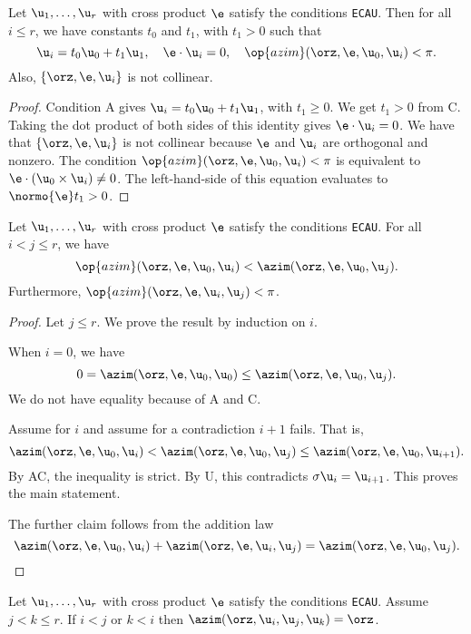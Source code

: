 \begin{lemma}[]  
Let $\u_1,\ldots,\u_r$ with cross product $\e$  satisfy the conditions {\tt ECAU}.  
Then for all $i\le r$, we have constants $t_0$ and $t_1$, with $t_1>0$ such that 
\[
\u_i = t_0 \u_0 + t_1 \u_1,\quad \e\cdot\u_i = 0,\quad \op{azim}(\orz,\e,\u_0,\u_i)<\pi.
\]
Also, $\{\orz,\e,\u_i\}$ is not collinear.
\end{lemma}

\begin{proof} Condition A gives $\u_i = t_0 \u_0 + t_1\u_1$, with $t_1\ge0$.  We get $t_1>0$ from C.
Taking the dot product of both sides of this identity gives $\e\cdot\u_i=0$.
We have that $\{\orz,\e,\u_i\}$ is not collinear because $\e$ and $\u_i$ are orthogonal and nonzero.
The condition $\op{azim}(\orz,\e,\u_0,\u_i)<\pi$ is equivalent to $\e\cdot (\u_0\times\u_i)\ne0$.
The left-hand-side of this equation evaluates to $\normo{\e}t_1 >0$.
\end{proof}

\begin{lemma}[]
Let $\u_1,\ldots,\u_r$ with cross product $\e$  satisfy the conditions {\tt ECAU}.  
For all $i<j\le r$, we have
\[
\op{azim}(\orz,\e,\u_0,\u_i)<\azim(\orz,\e,\u_0,\u_j).
\]
Furthermore, $\op{azim}(\orz,\e,\u_i,\u_j)<\pi$.
\end{lemma}

\begin{proof}
Let $j\le r$.  We prove the result by induction on $i$.

When $i=0$, we have
\[
0 = \azim(\orz,\e,\u_0,\u_0)\le \azim(\orz,\e,\u_0,\u_j).
\]
We do not have equality because of A and C.

Assume for $i$ and assume for a contradiction $i+1$ fails. 
That is,
\[
\azim(\orz,\e,\u_0,\u_i) < \azim(\orz,\e,\u_0,\u_j)\le \azim(\orz,\e,\u_0,\u_{i+1}).
\]
By AC, the inequality is strict.  By U, this contradicts $\sigma\u_i = \u_{i+1}$.
This proves the main statement.

The further claim follows from the addition law
\[
\azim(\orz,\e,\u_0,\u_i)+\azim(\orz,\e,\u_i,\u_j) = \azim(\orz,\e,\u_0,\u_j).
\]
\end{proof}

\begin{lemma}[]
Let $\u_1,\ldots,\u_r$ with cross product $\e$  satisfy the conditions {\tt ECAU}.  
Assume $j<k\le r$.  If $i<j$ or $k<i$ then $\azim(\orz,\u_i,\u_j,\u_k)=\orz$.
\end{lemma}

